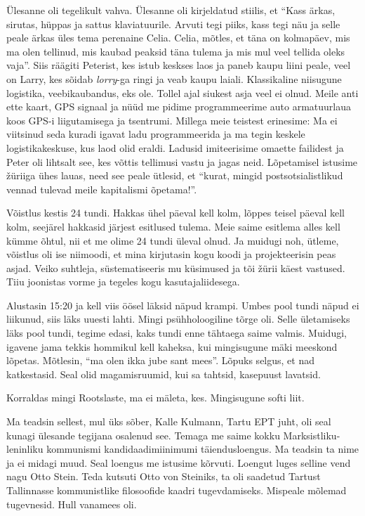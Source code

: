 
Ülesanne oli tegelikult vahva. Ülesanne oli kirjeldatud stiilis, et 
\enquote{Kass ärkas, sirutas, hüppas ja sattus klaviatuurile. Arvuti tegi 
piiks, kass tegi näu ja selle  peale ärkas üles tema perenaine Celia. Celia, 
mõtles, et  täna on kolmapäev, mis ma olen tellinud, mis kaubad peaksid täna 
tulema ja mis mul veel tellida oleks vaja}. Siis räägiti Peterist, kes istub 
keskses laos ja paneb kaupu liini peale, veel on Larry, kes sõidab 
\emph{lorry}-ga ringi ja veab  kaupu laiali. Klassikaline niisugune logistika, 
veebikaubandus, eks ole. Tollel ajal siukest asja veel ei olnud. Meile anti 
ette  kaart,  GPS signaal ja nüüd me pidime programmeerime auto armatuurlaua 
koos GPS-i liigutamisega ja tsentrumi. Millega meie teistest erinesime: Ma ei 
viitsinud seda kuradi igavat ladu programmeerida ja ma tegin keskele 
logistikakeskuse, kus laod olid eraldi. Ladusid imiteerisime omaette failidest 
ja  Peter oli lihtsalt see, kes võttis tellimusi vastu ja jagas neid. 
Lõpetamisel istusime žüriiga ühes lauas, need see peale ütlesid, et 
\enquote{kurat, mingid postsotsialistlikud vennad tulevad meile kapitalismi 
õpetama!}. 

Võistlus kestis 24 tundi. Hakkas ühel päeval kell kolm, lõppes teisel päeval 
kell kolm, seejärel hakkasid järjest esitlused tulema. Meie saime esitlema 
alles kell kümme õhtul, nii et me olime 24 tundi üleval olnud. Ja muidugi noh, 
ütleme, võistlus oli ise niimoodi, et mina kirjutasin kogu koodi ja 
projekteerisin peas asjad. Veiko suhtleja, süstematiseeris mu küsimused ja tõi 
žürii käest vastused. Tiiu joonistas vorme ja tegeles kogu kasutajaliidesega. 

Alustasin 15:20 ja kell viis öösel läksid näpud krampi. Umbes pool tundi näpud 
ei liikunud, siis läks uuesti lahti. Mingi psühholoogiline tõrge oli. Selle 
ületamiseks läks pool tundi, tegime edasi, kaks tundi enne tähtaega saime 
valmis. Muidugi, igavene jama tekkis  hommikul kell kaheksa, kui  mingisugune 
mäki meeskond lõpetas. Mõtlesin, \enquote{ma olen ikka jube sant mees}. Lõpuks 
selgus, et nad katkestasid. Seal olid magamisruumid, kui sa tahtsid, kasepuust 
lavatsid. 


Korraldas mingi Rootslaste, ma ei mäleta, kes. Mingisugune softi liit. 

Ma teadsin sellest, mul üks sõber, Kalle Kulmann, 
Tartu EPT juht, oli seal kunagi ülesande tegijana osalenud see. Temaga me saime 
kokku Marksistliku-leninliku kommunismi kandidaadimiinimumi täiendusloengus. Ma 
teadsin ta nime ja ei midagi muud. Seal loengus me istusime kõrvuti. Loengut 
luges selline vend nagu Otto Stein. Teda kutsuti Otto 
von Steiniks, ta oli saadetud Tartust Tallinnasse kommunistlike filosoofide 
kaadri tugevdamiseks. Mispeale mõlemad tugevnesid. Hull vanamees oli.

